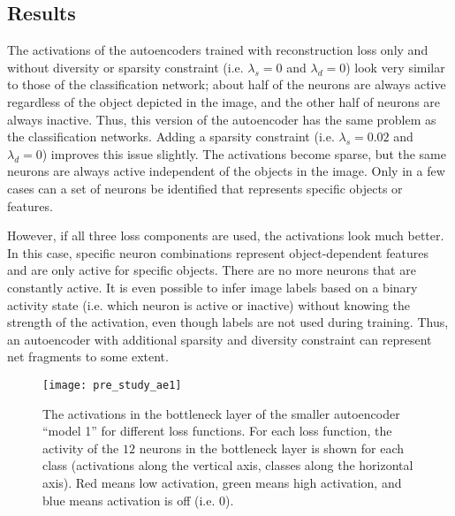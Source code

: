 \subsection{Results}
The activations of the autoencoders trained with reconstruction loss only and without diversity or sparsity constraint (i.e. $\lambda_s = 0$ and $\lambda_d = 0$) look very similar to those of the classification network; about half of the neurons are always active regardless of the object depicted in the image, and the other half of neurons are always inactive. Thus, this version of the autoencoder has the same problem as the classification networks. Adding a sparsity constraint (i.e. $\lambda_s = 0.02$ and $\lambda_d = 0$) improves this issue slightly. The activations become sparse, but the same neurons are always active independent of the objects in the image. Only in a few cases can a set of neurons be identified that represents specific objects or features.

However, if all three loss components are used, the activations look much better. In this case, specific neuron combinations represent object-dependent features and are only active for specific objects. There are no more neurons that are constantly active. It is even possible to infer image labels based on a binary activity state (i.e. which neuron is active or inactive) without knowing the strength of the activation, even though labels are not used during training. Thus, an autoencoder with additional sparsity and diversity constraint can represent net fragments to some extent.


\begin{figure}[h]
    \centering
    \texttt{[image: pre\_study\_ae1]}
    \caption[Network activations of the smaller autoencoder model]{The activations in the bottleneck layer of the smaller autoencoder ``model 1'' for different loss functions. For each loss function, the activity of the $12$ neurons in the bottleneck layer is shown for each class (activations along the vertical axis, classes along the horizontal axis). Red means low activation, green means high activation, and blue means activation is off (i.e. $0$).}
\end{figure}

